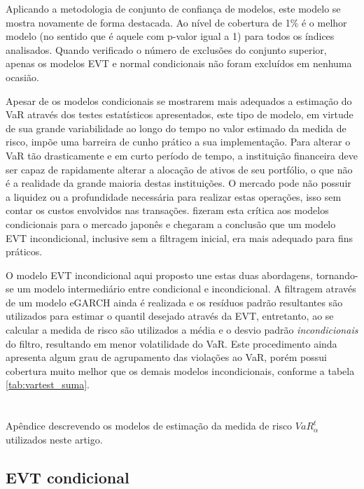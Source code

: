 \documentclass[1p]{elsarticle}
\theoremstyle{definition}
\begin{document}
Aplicando a metodologia de conjunto de confiança de modelos, este modelo se mostra novamente de forma destacada. Ao nível de cobertura de 1\% é o melhor modelo (no sentido que é aquele com p-valor igual a 1) para todos os índices analisados. Quando verificado o número de exclusões do conjunto superior, apenas os modelos EVT e normal condicionais não foram excluídos em nenhuma ocasião.

Apesar de os modelos condicionais se mostrarem mais adequados a estimação do VaR através dos testes estatísticos apresentados, este tipo de modelo, em virtude de sua grande variabilidade ao longo do tempo no valor estimado da medida de risco, impõe uma barreira de cunho prático a sua implementação. Para alterar o VaR tão drasticamente e em curto período de tempo, a instituição financeira deve ser capaz de rapidamente alterar a alocação de ativos de seu portfólio, o que não é a realidade da grande maioria destas instituições. O mercado pode não possuir a liquidez ou a profundidade necessária para realizar estas operações, isso sem contar os custos envolvidos nas transações. \cite{Danielsson2000} fizeram esta crítica aos modelos condicionais para o mercado japonês e chegaram a conclusão que um modelo EVT incondicional, inclusive sem a filtragem inicial, era mais adequado para fins práticos.

O modelo EVT incondicional aqui proposto une estas duas abordagens, tornando-se um modelo intermediário entre condicional e incondicional. A filtragem através de um modelo eGARCH ainda é realizada e os resíduos padrão resultantes são utilizados para estimar o quantil desejado através da EVT, entretanto, ao se calcular a medida de risco são utilizados a média e o desvio padrão \emph{incondicionais} do filtro, resultando em menor volatilidade do VaR. Este procedimento ainda apresenta algum grau de agrupamento das violações ao VaR, porém possui cobertura muito melhor que os demais modelos incondicionais, conforme a tabela \ref{tab:vartest_suma}.

\appendix
\section{}
\label{apendice}

Apêndice descrevendo os modelos de estimação da medida de risco $VaR^t_\alpha$ utilizados neste artigo.

\subsection{EVT condicional}
\label{sec:appendix_cevt}
\end{document}
